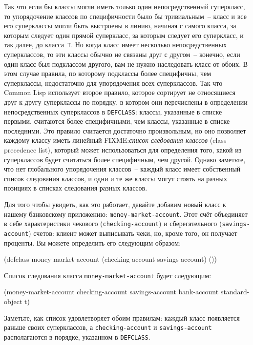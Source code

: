 Так что если бы классы могли иметь только один непосредственный суперкласс, то
упорядочение классов по специфичности было бы тривиальным~-- класс и все его суперклассы
могли быть выстроены в линию, начиная с самого класса, за которым следует один прямой
суперкласс, за которым следует его суперкласс, и так далее, до класса~\lstinline{T}.  Но
когда класс имеет несколько непосредственных суперклассов, то эти классы обычно не связаны
друг с другом~-- конечно, если один класс был подклассом другого, вам не нужно наследовать
класс от обоих.  В этом случае правила, по которому подклассы более специфичны, чем
суперклассы, недостаточно для упорядочения всех суперклассов.  Так что Common Lisp
использует второе правило, которое сортирует не относящиеся друг к другу суперклассы по
порядку, в котором они перечислены в определении непосредственных суперклассов в
\lstinline{DEFCLASS}: классы, указанные в списке первыми, считаются более специфичными,
чем классы, указанные в списке последними.  Это правило считается достаточно произвольным,
но оно позволяет каждому классу иметь линейный FIXME:\textit{список следования классов} (class
precedence list), который может использоваться для определения того, какой из суперклассов
будет считаться более специфичным, чем другой.  Однако заметьте, что нет глобального
упорядочения классов~-- каждый класс имеет собственный список следования классов, и одни и
те же классы могут стоять на разных позициях в списках следования разных классов.

Для того чтобы увидеть, как это работает, давайте добавим новый класс к нашему банковскому
приложению: \lstinline{money-market-account}.  Этот счёт объединяет в себе характеристики
чекового (\lstinline{checking-account}) и сберегательного (\lstinline{savings-account}) счетов:
клиент может выписывать чеки, но, кроме того, он получает проценты.  Вы можете определить
его следующим образом:

\begin{myverb}
(defclass money-market-account (checking-account savings-account) ())
\end{myverb}

Список следования класса \lstinline{money-market-account} будет следующим:

\begin{myverb}
(money-market-account
 checking-account
 savings-account
 bank-account
 standard-object
 t)
\end{myverb}

Заметьте, как список удовлетворяет обоим правилам: каждый класс появляется раньше своих
суперклассов, а \lstinline{checking-account} и \lstinline{savings-account} располагаются в порядке,
указанном в \lstinline{DEFCLASS}.

